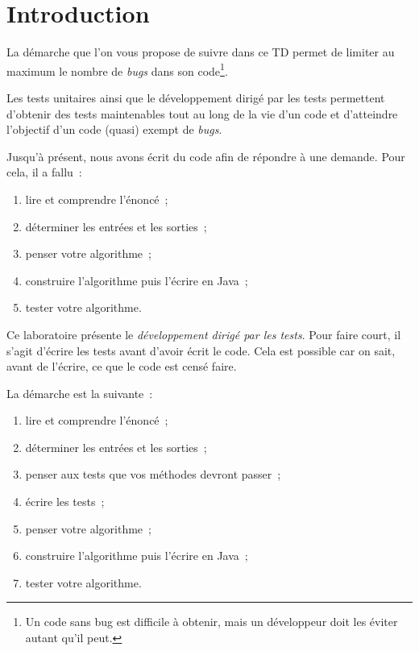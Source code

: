 \documentclass[a4paper,11pt]{style-esi/td}
\begin{document}

\section{Introduction}

La démarche que l'on vous propose de suivre dans ce TD permet de limiter au maximum le nombre de \textit{bugs} dans son code\footnote{Un code sans bug est difficile à obtenir, mais un développeur doit les éviter autant qu'il peut.}. 

Les tests unitaires ainsi que le développement dirigé par les tests permettent
d'obtenir des tests maintenables tout au long de la vie d'un code et
d'atteindre l'objectif d'un code (quasi) exempt de \textit{bugs}.

	Jusqu'à présent, nous avons écrit du code afin de répondre à une demande.
	Pour cela, il a fallu~:

	\begin{enumerate}
		\item lire et comprendre l'énoncé~;
		\item déterminer les entrées et les sorties~;
		\item penser votre algorithme~;
		\item construire l'algorithme puis l'écrire en Java~;
		\item tester votre algorithme.
	\end{enumerate}

	Ce laboratoire présente le \emph{développement dirigé par les tests}. Pour
	faire court, il s'agit d'écrire les tests avant d'avoir écrit le code. Cela
	est possible car on sait, avant de l'écrire, ce que le code est censé
	faire.

	La démarche est la suivante~:

	\begin{enumerate}
		\item lire et comprendre l'énoncé~;
		\item déterminer les entrées et les sorties~;
		\item penser aux tests que vos méthodes devront passer~;
		\item écrire les tests~;
		\item penser votre algorithme~;
		\item construire l'algorithme puis l'écrire en Java~;
		\item tester votre algorithme.
	\end{enumerate}
\end{document}
